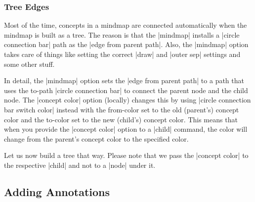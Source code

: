 \subsubsection{Tree Edges}

Most of the time, concepts in a mindmap are connected automatically when the
mindmap is built as a tree. The reason is that the |mindmap| installs a
|circle connection bar| path as the |edge from parent path|. Also, the
|mindmap| option takes care of things like setting the correct |draw| and
|outer sep| settings and some other stuff.

In detail, the |mindmap| option sets the |edge from parent path| to a path that
uses the to-path |circle connection bar| to connect the parent node and the
child node. The |concept color| option (locally) changes this by using
|circle connection bar switch color| instead with the from-color set to the old
(parent's) concept color and the to-color set to the new (child's) concept
color. This means that when you provide the |concept color| option to a |child|
command, the color will change from the parent's concept color to the specified
color.

Let us now build a tree that way. Please note that we pass the |concept color|
to the respective |child| and not to a |node| under it.
%
\begin{codeexample}[preamble={\usetikzlibrary{mindmap}}]
\end{codeexample}


\subsection{Adding Annotations}

